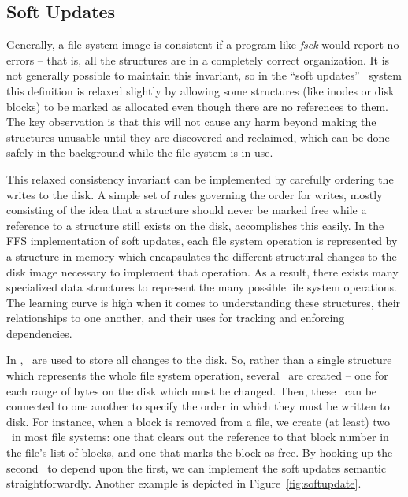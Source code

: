 \subsection {Soft Updates}
\label{sec:consistency:softupdate}

Generally, a file system image is consistent if a program like \emph{fsck}
would report no errors -- that is, all the structures are in a completely
correct organization. It is not generally possible to maintain this invariant,
so in the ``soft updates''~\cite{ganger00soft} system this definition is
relaxed slightly by allowing some structures (like inodes or disk blocks) to be
marked as allocated even though there are no references to them. The key
observation is that this will not cause any harm beyond making the structures
unusable until they are discovered and reclaimed, which can be done safely in
the background while the file system is in use.

This relaxed consistency invariant can be implemented by carefully ordering the
writes to the disk. A simple set of rules governing the order for writes,
mostly consisting of the idea that a structure should never be marked free
while a reference to a structure still exists on the disk, accomplishes this
easily. In the FFS implementation of soft updates, each file system operation
is represented by a structure in memory which encapsulates the different
structural changes to the disk image necessary to implement that operation.
As a result, there exists many specialized data structures to represent the
many possible file system operations. The learning curve is high when it comes
to understanding these structures, their relationships to one another, and
their uses for tracking and enforcing dependencies.

In \Kudos, \chdescs\ are used to store all changes to the disk. So, rather than
a single structure which represents the whole file system operation, several
\chdescs\ are created -- one for each range of bytes on the disk which must be
changed. Then, these \chdescs\ can be connected to one another to specify the
order in which they must be written to disk. For instance, when a block is
removed from a file, we create (at least) two \chdescs\ in most file systems:
one that clears out the reference to that block number in the file's list of
blocks, and one that marks the block as free. By hooking up the second \chdesc\
to depend upon the first, we can implement the soft updates semantic
straightforwardly. Another example is depicted in Figure~\ref{fig:softupdate}.

